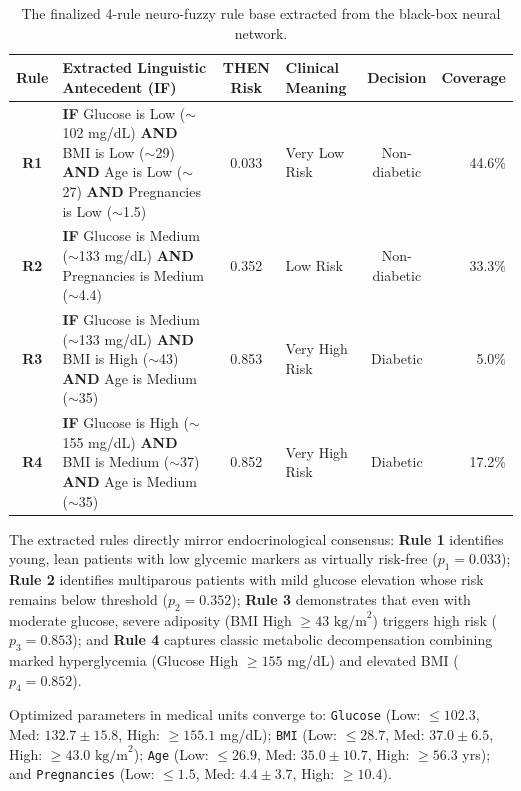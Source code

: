 \documentclass{report}
\begin{document}
\begin{table}[htbp]
\centering
\footnotesize
\renewcommand{\arraystretch}{0.75}
\setlength{\tabcolsep}{3pt}
\begin{tabularx}{\textwidth}{c X c l c r}
\toprule
\textbf{Rule} & \textbf{Extracted Linguistic Antecedent (IF)} & \textbf{THEN Risk} & \textbf{Clinical Meaning} & \textbf{Decision} & \textbf{Coverage} \\
\midrule
\textbf{R1} & \textbf{IF} Glucose is Low ($\sim$102 mg/dL) \textbf{AND} BMI is Low ($\sim$29) \textbf{AND} Age is Low ($\sim$27) \textbf{AND} Pregnancies is Low ($\sim$1.5) & 0.033 & Very Low Risk & Non-diabetic & 44.6\% \\
\midrule
\textbf{R2} & \textbf{IF} Glucose is Medium ($\sim$133 mg/dL) \textbf{AND} Pregnancies is Medium ($\sim$4.4) & 0.352 & Low Risk & Non-diabetic & 33.3\% \\
\midrule
\textbf{R3} & \textbf{IF} Glucose is Medium ($\sim$133 mg/dL) \textbf{AND} BMI is High ($\sim$43) \textbf{AND} Age is Medium ($\sim$35) & 0.853 & Very High Risk & Diabetic & 5.0\% \\
\midrule
\textbf{R4} & \textbf{IF} Glucose is High ($\sim$155 mg/dL) \textbf{AND} BMI is Medium ($\sim$37) \textbf{AND} Age is Medium ($\sim$35) & 0.852 & Very High Risk & Diabetic & 17.2\% \\
\bottomrule
\end{tabularx}
\caption[Finalized 4-Rule Neuro-Fuzzy Rule Base]{The finalized 4-rule neuro-fuzzy rule base extracted from the black-box neural network.}
\label{tab:final_rulebase}
\end{table}

The extracted rules directly mirror endocrinological consensus: \textbf{Rule 1} identifies young, lean patients with low glycemic markers as virtually risk-free ($p_1 = 0.033$); \textbf{Rule 2} identifies multiparous patients with mild glucose elevation whose risk remains below threshold ($p_2 = 0.352$); \textbf{Rule 3} demonstrates that even with moderate glucose, severe adiposity (BMI High $\ge 43\text{ kg/m}^2$) triggers high risk ($p_3 = 0.853$); and \textbf{Rule 4} captures classic metabolic decompensation combining marked hyperglycemia (Glucose High $\ge 155$ mg/dL) and elevated BMI ($p_4 = 0.852$).

Optimized parameters in medical units converge to: \texttt{Glucose} (Low: $\le 102.3$, Med: $132.7 \pm 15.8$, High: $\ge 155.1$ mg/dL); \texttt{BMI} (Low: $\le 28.7$, Med: $37.0 \pm 6.5$, High: $\ge 43.0\text{ kg/m}^2$); \texttt{Age} (Low: $\le 26.9$, Med: $35.0 \pm 10.7$, High: $\ge 56.3$ yrs); and \texttt{Pregnancies} (Low: $\le 1.5$, Med: $4.4 \pm 3.7$, High: $\ge 10.4$).
\end{document}
